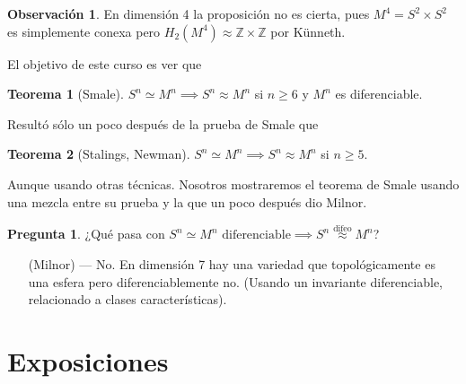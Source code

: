 \documentclass[spanish]{book}
\theoremstyle{definition}
\newtheorem*{obs}{Observación}
\newtheorem*{teo}{Teorema}
\newtheorem*{pregunta}{Pregunta}
\newcommand{\Z}{\mathbb{Z}}
\begin{document}
\begin{obs}
	En dimensión 4 la proposición no es cierta, pues $M^4=S^2\times S^2$ es simplemente conexa pero $H_2(M^4)\approx\Z\times\Z$ por Künneth.
\end{obs}

El objetivo de este curso es ver que
\begin{teo}[Smale]
	$S^n\simeq M^n\implies S^n\approx M^n$ si $n\geq 6$ y $M^n$ es diferenciable.
\end{teo}
Resultó sólo un poco después de la prueba de Smale que
\begin{teo}[Stalings, Newman]
	$S^n\simeq M^n\implies S^n\approx M^n$ si $n\geq 5$.
\end{teo}
Aunque usando otras técnicas. Nosotros mostraremos el teorema de Smale usando una mezcla entre su prueba y la que un poco después dio Milnor.

\begin{pregunta}
	¿Qué pasa con $S^n\simeq M^n \text{ diferenciable}\implies S^n\overset{\text{difeo}}{\approx} M^n$?
\end{pregunta}
\begin{enumerate}
	\item[(Milnor) ---]  No. En dimensión 7 hay una variedad que topológicamente es una esfera pero diferenciablemente no. (Usando un invariante diferenciable, relacionado a clases características).
\end{enumerate}

\clearpage
\chapter{Exposiciones}
\end{document}
